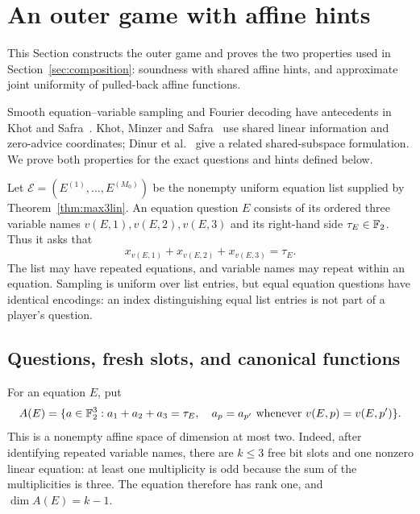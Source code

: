\section{An outer game with affine hints}
\label{sec:outer}

This Section constructs the outer game and proves the two properties
used in Section~\ref{sec:composition}: soundness with shared affine hints,
and approximate joint uniformity of pulled-back affine functions.

Smooth equation--variable sampling and Fourier decoding have antecedents
in Khot and Safra~\cite[Sections~3.2--3.4 and~5.2]{KS13}.
Khot, Minzer and Safra~\cite[Sections~3.3--3.4]{KMS17} use shared linear
information and zero-advice coordinates; Dinur et al.~\cite[Section~5.2,
Lemma~5.4]{DKKMS2025} give a related shared-subspace formulation.
We prove both properties for the exact questions and hints defined below.

Let $\mathcal E=(E^{(1)},\ldots,E^{(M_0)})$ be the nonempty uniform
equation list supplied by Theorem~\ref{thm:max3lin}. An equation question
$E$ consists of its ordered three variable names $v(E,1),v(E,2),v(E,3)$
and its right-hand side $\tau_E\in\mathbb F_2$. Thus it asks that
\[
 x_{v(E,1)}+x_{v(E,2)}+x_{v(E,3)}=\tau_E.
\]
The list may have repeated equations, and variable names may repeat within
an equation. Sampling is uniform over list entries, but equal equation
questions have identical encodings: an index distinguishing equal list
entries is not part of a player's question.

\subsection{Questions, fresh slots, and canonical functions}

For an equation $E$, put
\[
 A(E)=\{a\in\mathbb F_2^3:
        a_1+a_2+a_3=\tau_E,\quad
        a_p=a_{p'}\text{ whenever }v(E,p)=v(E,p')\}.
\]
This is a nonempty affine space of dimension at most two. Indeed, after
identifying repeated variable names, there are $k\le3$ free bit slots and
one nonzero linear equation: at least one multiplicity is odd because the
sum of the multiplicities is three. The equation therefore has rank one,
and $\dim A(E)=k-1$.


